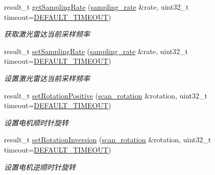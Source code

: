 \begin{DoxyCompactItemize}
\begin{DoxyCompactList}
\end{DoxyCompactList}\item 
result\+\_\+t \hyperlink{classydlidar_1_1_y_dlidar_driver_a7b7812329013f119235abf74da397aaa}{get\+Sampling\+Rate} (\hyperlink{structsampling__rate}{sampling\+\_\+rate} \&rate, uint32\+\_\+t timeout=\hyperlink{classydlidar_1_1_y_dlidar_driver_a13a4f2dc4067b43794b2c47c06d5d27aa07c79ce96f468ff4b40495ef84584442}{D\+E\+F\+A\+U\+L\+T\+\_\+\+T\+I\+M\+E\+O\+UT})
\begin{DoxyCompactList}\small\item\em 获取激光雷达当前采样频率 ~\newline
\end{DoxyCompactList}\item 
result\+\_\+t \hyperlink{classydlidar_1_1_y_dlidar_driver_a30f9219bcf3aa3a8df2bbdae983ccd02}{set\+Sampling\+Rate} (\hyperlink{structsampling__rate}{sampling\+\_\+rate} \&rate, uint32\+\_\+t timeout=\hyperlink{classydlidar_1_1_y_dlidar_driver_a13a4f2dc4067b43794b2c47c06d5d27aa07c79ce96f468ff4b40495ef84584442}{D\+E\+F\+A\+U\+L\+T\+\_\+\+T\+I\+M\+E\+O\+UT})
\begin{DoxyCompactList}\small\item\em 设置激光雷达当前采样频率 ~\newline
\end{DoxyCompactList}\item 
result\+\_\+t \hyperlink{classydlidar_1_1_y_dlidar_driver_ae6645c26b9b46b2aa4aaae87521a38f1}{set\+Rotation\+Positive} (\hyperlink{structscan__rotation}{scan\+\_\+rotation} \&rotation, uint32\+\_\+t timeout=\hyperlink{classydlidar_1_1_y_dlidar_driver_a13a4f2dc4067b43794b2c47c06d5d27aa07c79ce96f468ff4b40495ef84584442}{D\+E\+F\+A\+U\+L\+T\+\_\+\+T\+I\+M\+E\+O\+UT})
\begin{DoxyCompactList}\small\item\em 设置电机顺时针旋转 ~\newline
\end{DoxyCompactList}\item 
result\+\_\+t \hyperlink{classydlidar_1_1_y_dlidar_driver_a1569723d0e46b801aee5284455f3b1d1}{set\+Rotation\+Inversion} (\hyperlink{structscan__rotation}{scan\+\_\+rotation} \&rotation, uint32\+\_\+t timeout=\hyperlink{classydlidar_1_1_y_dlidar_driver_a13a4f2dc4067b43794b2c47c06d5d27aa07c79ce96f468ff4b40495ef84584442}{D\+E\+F\+A\+U\+L\+T\+\_\+\+T\+I\+M\+E\+O\+UT})
\begin{DoxyCompactList}\small\item\em 设置电机逆顺时针旋转 ~\newline

\end{DoxyCompactList}
\end{DoxyCompactItemize}
